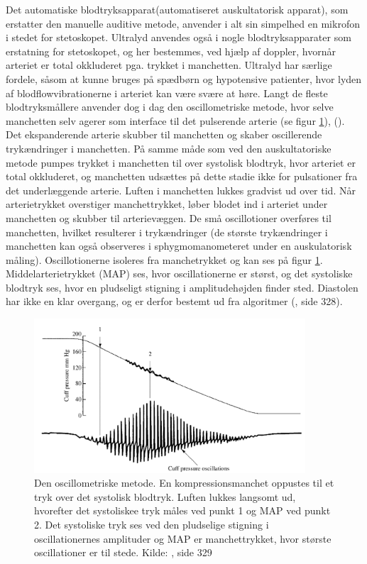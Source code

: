 Det automatiske blodtryksapparat(automatiseret auskultatorisk apparat), som erstatter den manuelle auditive metode, anvender i alt sin simpelhed en mikrofon i stedet for stetoskopet. Ultralyd anvendes også i nogle blodtryksapparater som erstatning for stetoskopet, og her bestemmes, ved hjælp af doppler, hvornår arteriet er total okkluderet pga. trykket i manchetten. Ultralyd har særlige fordele, såsom at kunne bruges på spædbørn og hypotensive patienter, hvor lyden af blodflowvibrationerne i arteriet kan være svære at høre. Langt de fleste blodtryksmållere anvender dog i dag den oscillometriske metode, hvor selve manchetten selv agerer som interface til det pulserende arterie (se figur \ref{fig:OscillometriskMetode}), (\cite{RefWorks:24}). Det ekspanderende arterie skubber til manchetten og skaber oscillerende trykændringer i manchetten. På samme måde som ved den auskultatoriske metode pumpes trykket i manchetten til over systolisk blodtryk, hvor arteriet er total okkluderet, og manchetten udsættes på dette stadie ikke for pulsationer fra det underlæggende arterie. Luften i manchetten lukkes gradvist ud over tid. Når arterietrykket overstiger manchettrykket, løber blodet ind i arteriet under manchetten og skubber til arterievæggen. De små oscillotioner overføres til manchetten, hvilket resulterer i trykændringer (de største trykændringer i manchetten kan også observeres i sphygmomanometeret under en auskulatorisk måling). Oscillotionerne isoleres fra manchetrykket og kan ses på figur \ref{fig:OscillometriskMetode}. Middelarterietrykket (MAP) ses, hvor oscillationerne er størst, og det systoliske blodtryk ses, hvor en pludseligt stigning i amplitudehøjden finder sted. Diastolen har ikke en klar overgang, og er derfor bestemt ud fra algoritmer (\cite{RefWorks:27}, side 328).

\begin{figure}[H]
	\centering
	\includegraphics[width=0.9\textwidth]{billeder/OscillometriskMetode.png}
	\caption{Den oscillometriske metode. En kompressionsmanchet oppustes til et tryk over det systolisk blodtryk. Luften lukkes langsomt ud, hvorefter det systoliskee tryk måles ved punkt 1 og MAP ved punkt 2. Det systoliske tryk ses ved den pludselige stigning i oscillationernes amplituder og MAP er manchettrykket, hvor største oscillationer er til stede. Kilde: \cite{RefWorks:27}, side 329} \label{fig:OscillometriskMetode}
\end{figure}

